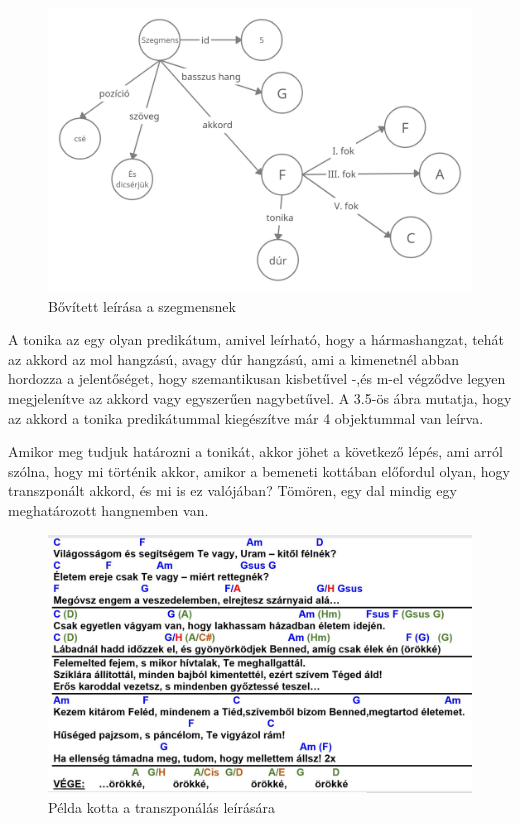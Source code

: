 \begin{figure}[h]
	\includegraphics[scale=0.3]{images/rdf_graph_4.png}
	\caption{Bővített leírása a szegmensnek}
	\label{fig:graph4}
\end{figure}
A tonika az egy olyan predikátum, amivel leírható, hogy a hármashangzat, tehát az akkord az mol hangzású, avagy dúr hangzású, ami a kimenetnél abban hordozza a jelentőséget, hogy szemantikusan kisbetűvel -,és m-el végződve legyen megjelenítve az akkord vagy egyszerűen nagybetűvel. A 3.5-ös ábra mutatja, hogy az akkord a tonika predikátummal kiegészítve már 4 objektummal van leírva.
\par
Amikor meg tudjuk határozni a tonikát, akkor jöhet a következő lépés, ami arról szólna, hogy mi történik akkor, amikor a bemeneti kottában előfordul olyan, hogy transzponált akkord, és mi is ez valójában? Tömören, egy dal mindig egy meghatározott hangnemben van.
\newpage
\begin{figure}[h]
	\includegraphics[scale=0.3]{images/samples/27_zsoltar.jpg}
	\caption{Példa kotta a transzponálás leírására}
	\label{fig:song2}
\end{figure}
